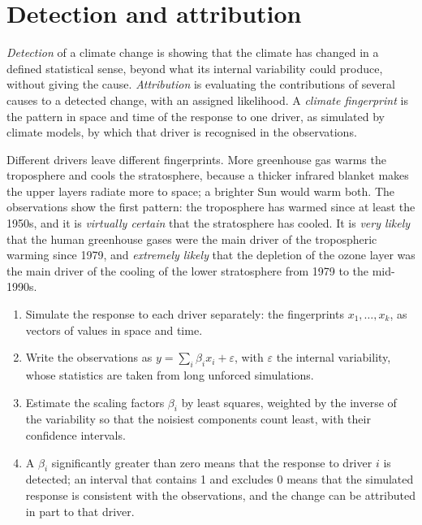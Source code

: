 \section{Detection and attribution}\label{sec:b2:anthropogenic-climate-change:attribution}

\begin{definition}\label{def:b2:anthropogenic-climate-change:da}
\emph{Detection} of a climate change is showing that the
climate has changed in a defined statistical sense, beyond what its internal variability could
produce, without giving the cause. \emph{Attribution} is evaluating the
contributions of several causes to a detected change, with an assigned likelihood. A \emph{climate
fingerprint} is the pattern in space and time of the response to one
driver, as simulated by climate models, by which that driver is recognised in the observations.
\end{definition}

Different drivers leave different fingerprints. More greenhouse gas warms the troposphere and cools
the stratosphere, because a thicker infrared blanket makes the upper layers radiate more to space;
a brighter Sun would warm both. The observations show the first pattern: the troposphere has warmed
since at least the 1950s, and it is \emph{virtually certain} that the stratosphere has cooled. It is
\emph{very likely} that the human greenhouse gases were the main driver of the tropospheric warming
since 1979, and \emph{extremely likely} that the depletion of the ozone layer was the main driver of
the cooling of the lower stratosphere from 1979 to the mid-1990s.

\begin{method}\label{met:b2:anthropogenic-climate-change:fingerprinting}
\begin{enumerate}
  \item Simulate the response to each driver separately: the fingerprints $x_1, \dots, x_k$, as
        vectors of values in space and time.
  \item Write the observations as $y = \sum_i \beta_i x_i + \varepsilon$, with $\varepsilon$ the
        internal variability, whose statistics are taken from long unforced simulations.
  \item Estimate the scaling factors $\beta_i$ by least squares, weighted by the inverse of the
        variability so that the noisiest components count least, with their confidence intervals.
  \item A $\beta_i$ significantly greater than zero means that the response to driver $i$ is
        detected; an interval that contains 1 and excludes 0 means that the simulated response is
        consistent with the observations, and the change can be attributed in part to that driver.
\end{enumerate}
\end{method}

